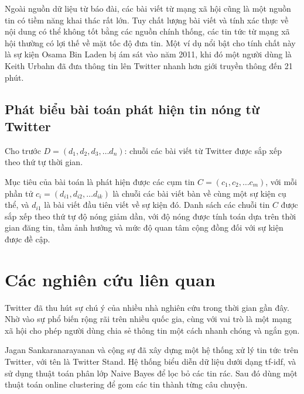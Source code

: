 	Ngoài nguồn dữ liệu từ báo đài, các bài viết từ mạng xã hội cũng là một nguồn tin có tiềm năng khai thác rất lớn. Tuy chất lượng bài viết và tính xác thực về nội dung có thể không tốt bằng các nguồn chính thống, các tin tức từ mạng xã hội thường có lợi thế về mặt tốc độ đưa tin. Một ví dụ nổi bật cho tính chất này là sự kiện Osama Bin Laden bị ám sát vào năm 2011, khi đó một người dùng là Keith Urbahn đã đưa thông tin lên Twitter nhanh hơn giới truyền thông đến 21 phút.

	\subsection{Phát biểu bài toán phát hiện tin nóng từ Twitter}
	Cho trước $D = (d_1, d_2, d_3,… d_n)$: chuỗi các bài viết từ Twitter được sắp xếp theo thứ tự thời gian.
	
	Mục tiêu của bài toán là phát hiện được các cụm tin $C = (c_1, c_2,… c_m)$, với mỗi phần tử $c_i = (d_{i1}, d_{i2},… d_{ik})$ là chuỗi các bài viết bàn về cùng một sự kiện cụ thể, và $d_{i1}$ là bài viết đầu tiên viết về sự kiện đó. Danh sách các chuỗi tin $C$  được sắp xếp theo thứ tự độ nóng giảm dần, với độ nóng được tính toán dựa trên thời gian đăng tin, tầm ảnh hưởng và mức độ quan tâm cộng đồng đối với sự kiện được đề cập.
	
	
\section{Các nghiên cứu liên quan}
Twitter đã thu hút sự chú ý của nhiều nhà nghiên cứu trong thời gian gần đây. Nhờ vào sự phổ biến rộng rãi trên nhiều quốc gia, cùng với vai trò là một mạng xã hội cho phép người dùng chia sẻ thông tin một cách nhanh chóng và ngắn gọn.

Jagan Sankaranarayanan và cộng sự \cite{TwiterStand:Sankaranarayanan} đã xây dựng một hệ thống xử lý tin tức trên Twitter, với tên là Twitter Stand. Hệ thống biểu diễn dữ liệu dưới dạng tf-idf, và sử dụng thuật toán phân lớp Naive Bayes để lọc bỏ các tin rác. Sau đó dùng một thuật toán online clustering để gom các tin thành từng câu chuyện.


